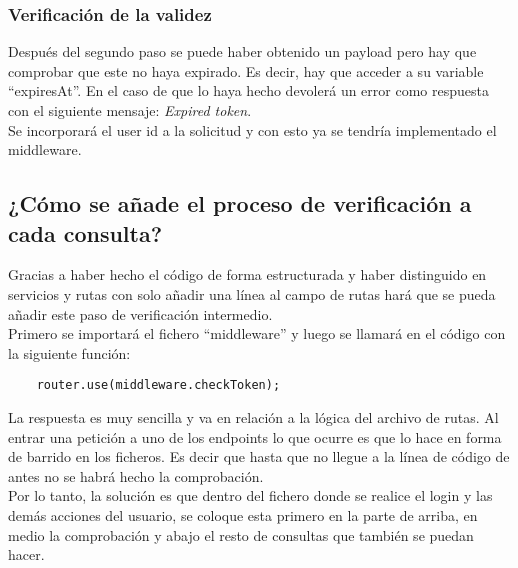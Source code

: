 \subsubsection{Verificación de la validez}
Después del segundo paso se puede haber obtenido un payload pero hay que comprobar que este no haya expirado. Es decir, hay que acceder a su variable ``expiresAt''. En el caso de que lo haya hecho devolerá un error como respuesta con el siguiente mensaje: \textit{Expired token}.
\vspace{\baselineskip}
\\Se incorporará el user id a la solicitud y con esto ya se tendría implementado el middleware.

\subsection{¿Cómo se añade el proceso de verificación a cada consulta?}
Gracias a haber hecho el código de forma estructurada y haber distinguido en servicios y rutas con solo añadir una línea al campo de rutas hará que se pueda añadir este paso de verificación intermedio.
\\Primero se importará el fichero ``middleware'' y luego se llamará en el código con la siguiente función:
\begin{verbatim}
    router.use(middleware.checkToken);
\end{verbatim}

\begin{tcolorbox}
    [colback=green!5!white,colframe=green!75!black,fonttitle=\bfseries,title=¿Cómo se inicia sesión si no se tiene un token?]
    La respuesta es muy sencilla y va en relación a la lógica del archivo de rutas. Al entrar una petición a uno de los endpoints lo que ocurre es que lo hace en forma de barrido en los ficheros. Es decir que hasta que no llegue a la línea de código de antes no se habrá hecho la comprobación.
    \\Por lo tanto, la solución es que dentro del fichero donde se realice el login y las demás acciones del usuario, se coloque esta primero en la parte de arriba, en medio la comprobación y abajo el resto de consultas que también se puedan hacer.
\end{tcolorbox}

